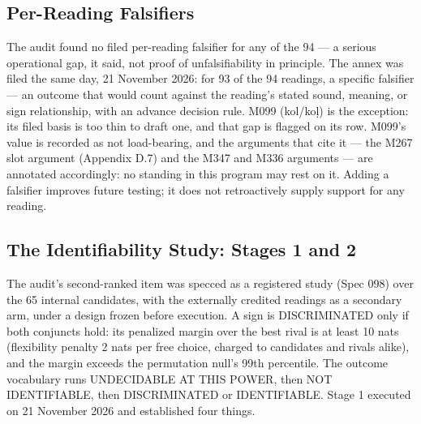 \documentclass[11pt]{article}
\begin{document}
\subsection{Per-Reading Falsifiers}\label{appendix-d8-falsifiers}

The audit found no filed per-reading falsifier for any of the 94
--- a serious operational gap, it said, not proof of
unfalsifiability in principle. The annex was filed the same day,
21 November 2026: for 93 of the 94 readings, a specific
falsifier --- an outcome that would count against the reading's
stated sound, meaning, or sign relationship, with an advance
decision rule. M099 (kol/koḷ) is the exception: its filed basis
is too thin to draft one, and that gap is flagged on its row.
M099's value is recorded as not load-bearing, and the arguments
that cite it --- the M267 slot argument (Appendix D.7) and the
M347 and M336 arguments --- are annotated accordingly: no
standing in this program may rest on it. Adding a falsifier
improves future testing; it does not retroactively supply
support for any reading.

\subsection{The Identifiability Study: Stages 1 and
2}\label{appendix-d9-spec098}

The audit's second-ranked item was specced as a registered study
(Spec 098) over the 65 internal candidates, with the externally
credited readings as a secondary arm, under a design frozen
before execution. A sign is DISCRIMINATED only if both conjuncts
hold: its penalized margin over the best rival is at least 10
nats (flexibility penalty 2 nats per free choice, charged to
candidates and rivals alike), and the margin exceeds the
permutation null's 99th percentile. The outcome vocabulary runs
UNDECIDABLE AT THIS POWER, then NOT IDENTIFIABLE, then
DISCRIMINATED or IDENTIFIABLE. Stage 1 executed on 21 November
2026 and established four things.
\end{document}
